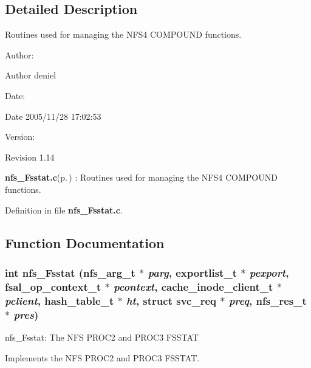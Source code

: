 \subsection{Detailed Description}
Routines used for managing the NFS4 COMPOUND functions. 

\begin{Desc}
\item[Author:]\begin{Desc}
\item[Author]deniel \end{Desc}
\end{Desc}
\begin{Desc}
\item[Date:]\begin{Desc}
\item[Date]2005/11/28 17:02:53 \end{Desc}
\end{Desc}
\begin{Desc}
\item[Version:]\begin{Desc}
\item[Revision]1.14 \end{Desc}
\end{Desc}
{\bf nfs\_\-Fsstat.c}{\rm (p.\,\pageref{nfs__Fsstat_8c})} : Routines used for managing the NFS4 COMPOUND functions.

Definition in file {\bf nfs\_\-Fsstat.c}.

\subsection{Function Documentation}
\subsubsection{\setlength{\rightskip}{0pt plus 5cm}int nfs\_\-Fsstat (nfs\_\-arg\_\-t $\ast$ {\em parg}, exportlist\_\-t $\ast$ {\em pexport}, fsal\_\-op\_\-context\_\-t $\ast$ {\em pcontext}, cache\_\-inode\_\-client\_\-t $\ast$ {\em pclient}, hash\_\-table\_\-t $\ast$ {\em ht}, struct svc\_\-req $\ast$ {\em preq}, nfs\_\-res\_\-t $\ast$ {\em pres})}\label{nfs__Fsstat_8c_a0}


nfs\_\-Fsstat: The NFS PROC2 and PROC3 FSSTAT

Implements the NFS PROC2 and PROC3 FSSTAT.

